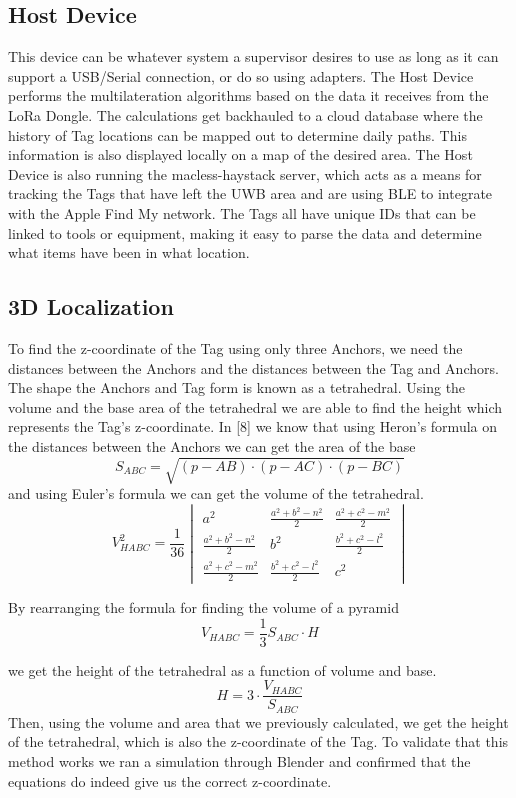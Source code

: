 \documentclass[conference]{IEEEtran}
\begin{document}
\subsection{Host Device}

This device can be whatever system a supervisor desires to use as long as 
it can support a USB/Serial connection, or do so using adapters. The Host Device
performs the multilateration algorithms based on the data it receives from the LoRa Dongle.
The calculations get backhauled to a cloud database 
where the history of Tag locations can be mapped out to determine 
daily paths. This information is also displayed locally on a map of 
the desired area. The Host Device is also running the macless-haystack 
server, which acts as a means for tracking the Tags that have 
left the UWB area and are using BLE to integrate with the Apple Find 
My network. The Tags all have unique IDs that can be linked to tools or 
equipment, making it easy to parse the data and determine what items have 
been in what location. 
\subsection{3D Localization}
To find the z-coordinate of the Tag using only three Anchors, 
we need the distances between the Anchors and the distances between 
the Tag and Anchors. The shape the Anchors and Tag form is known as a 
tetrahedral. Using the volume and the base area of the tetrahedral we 
are able to find the height which represents the Tag’s z-coordinate. 
In [8] we know that using Heron’s formula on the distances between the 
Anchors we can get the area of the base
\[S_{ABC} = \sqrt{(p - AB)\cdot(p-AC)\cdot(p-BC)}\]
and using Euler’s formula we can get the volume of the tetrahedral.
\[V_{HABC}^2 = \frac{1}{36}
\begin{vmatrix}
    a^2 & \frac{a^2+b^2-n^2}{2} & \frac{a^2+c^2-m^2}{2} \\
    \frac{a^2+b^2-n^2}{2} & b^2 & \frac{b^2+c^2-l^2}{2} \\
    \frac{a^2+c^2-m^2}{2} & \frac{b^2+c^2-l^2}{2} & c^2
\end{vmatrix}\]

By rearranging the formula for finding the volume of a pyramid
\[V_{HABC} = \frac{1}{3}S_{ABC} \cdot H\]

we get the height of the tetrahedral as a function of volume and base.
\[H = 3 \cdot \frac{V_{HABC}}{S_{ABC}}\]
Then, using the volume and area that we previously calculated, 
we get the height of the tetrahedral, which is also the z-coordinate of
the Tag. To validate that this method works we ran a simulation through 
Blender and confirmed that the equations do indeed give us the correct 
z-coordinate.
\end{document}
